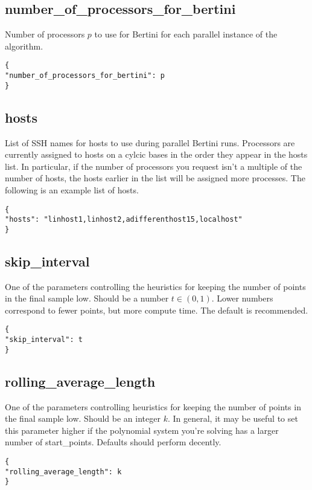 \documentclass[11pt]{article}
\begin{document}
\subsection{number\_of\_processors\_for\_bertini}
Number of processors $p$ to use for Bertini for each parallel instance of the algorithm. 

\begin{verbatim}
{ 
"number_of_processors_for_bertini": p
}
\end{verbatim} 

\subsection{hosts} 
List of SSH names for hosts to use during parallel Bertini runs. Processors are currently assigned to hosts on a cylcic bases in the order they appear in the hosts list. In particular, if the number of processors you request isn't a multiple of the number of hosts, the hosts earlier in the list will be assigned more processes. The following is an example list of hosts.

\begin{verbatim}
{ 
"hosts": "linhost1,linhost2,adifferenthost15,localhost"
}
\end{verbatim}  

\subsection{skip\_interval} 
One of the parameters controlling the heuristics for keeping the number of points in the final sample low. Should be a number $t \in (0,1)$. Lower numbers correspond to fewer points, but more compute time. The default is recommended.

\begin{verbatim}
{ 
"skip_interval": t
}
\end{verbatim} 

\subsection{rolling\_average\_length} 
One of the parameters controlling heuristics for keeping the number of points in the final sample low. Should be an integer $k$. In general, it may be useful to set this parameter higher if the polynomial system you're solving has a larger number of start\_points. Defaults should perform decently.

\begin{verbatim}
{ 
"rolling_average_length": k
}
\end{verbatim} 
\end{document}
